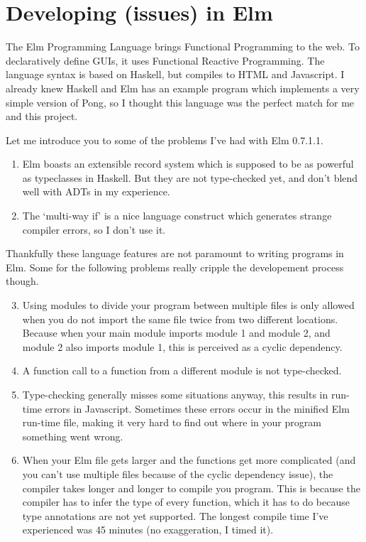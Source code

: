 \documentclass[a4paper]{article}
\begin{document}
\section{Developing (issues) in Elm}
The Elm Programming Language brings Functional Programming to the web. To
 declaratively define GUIs, it uses Functional Reactive Programming. The
 language syntax is based on Haskell, but compiles to HTML and Javascript. 
 I already knew Haskell and Elm has an example program which implements a very
 simple version of Pong, so I thought this language was the perfect match for me
 and this project. 

Let me introduce you to some of the problems I've had with Elm 0.7.1.1.

\begin{enumerate}
\item Elm boasts an extensible record system which is supposed to be as powerful
 as typeclasses in Haskell. But they are not type-checked yet, and don't blend
 well with ADTs in my experience. 
\item The `multi-way if' is a nice language construct which generates
 strange compiler errors, so I don't use it. 
\end{enumerate}

Thankfully these language features are not paramount to writing programs in Elm.
 Some for the following problems really cripple the developement process though.
 
\begin{enumerate} \setcounter{enumi}{2}
\item Using modules to divide your program between multiple files is only
 allowed when you do not import the same file twice from two different
 locations. Because when your main module imports module 1 and module 2, and
 module 2 also imports module 1, this is perceived as a cyclic dependency. 
\item A function call to a function from a different module is not type-checked.
\item Type-checking generally misses some situations anyway, this results in
 run-time errors in Javascript. Sometimes these errors occur in the minified
 Elm run-time file, making it very hard to find out where in your program
 something went wrong.
\item When your Elm file gets larger and the functions get more complicated (and
 you can't use multiple files because of the cyclic dependency issue), the
 compiler takes longer and longer to compile you program. This is because the
 compiler has to infer the type of every function, which it has to do because
 type annotations are not yet supported. The longest compile time I've
 experienced was 45 minutes (no exaggeration, I timed it). 
\end{enumerate}
\end{document}
